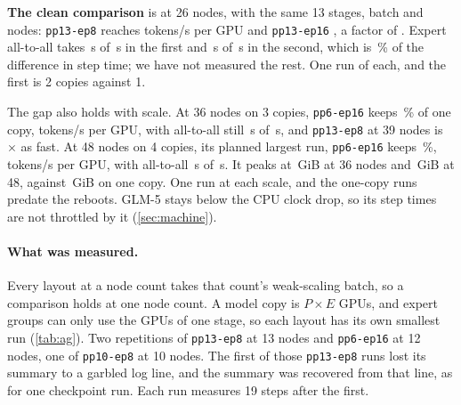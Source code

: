 \textbf{The clean comparison} is at 26 nodes, with the same 13 stages, batch and nodes: \texttt{pp13-ep8} reaches \TriGlmEpEightTok{} tokens/s per GPU and \texttt{pp13-ep16} \TriGlmEpSixteenTok, a factor of \TriGlmEpTwoSixRatio. Expert all-to-all takes \TriGlmEpEightAtoa\,s of \TriGlmEpEightStep\,s in the first and \TriGlmEpSixteenAtoa\,s of \TriGlmEpSixteenStep\,s in the second, which is \TriGlmEpAtoaShare\,\% of the difference in step time; we have not measured the rest. One run of each, and the first is 2 copies against 1.

The gap also holds with scale. At 36 nodes on 3 copies, \texttt{pp6-ep16} keeps \TriGlmThirtySixEff\,\% of one copy, \TriGlmThirtySixTok{} tokens/s per GPU, with all-to-all still \TriGlmThirtySixAtoa\,s of \TriGlmThirtySixStep\,s, and \texttt{pp13-ep8} at 39 nodes is $\times$\TriGlmEpRatioTop{} as fast. At 48 nodes on 4 copies, its planned largest run, \texttt{pp6-ep16} keeps \TriGlmFortyEightEff\,\%, \TriGlmFortyEightTok{} tokens/s per GPU, with all-to-all \TriGlmFortyEightAtoa\,s of \TriGlmFortyEightStep\,s. It peaks at \TriGlmThirtySixMem\,GiB at 36 nodes and \TriGlmFortyEightMem\,GiB at 48, against \TriGlmSixMem\,GiB on one copy. One run at each scale, and the one-copy runs predate the reboots. GLM-5 stays below the CPU clock drop, so its step times are not throttled by it (\cref{sec:machine}).

\paragraph{What was measured.} Every layout at a node count takes that count's weak-scaling batch, so a comparison holds at one node count. A model copy is $P\times E$ GPUs, and expert groups can only use the GPUs of one stage, so each layout has its own smallest run (\cref{tab:ag}). Two repetitions of \texttt{pp13-ep8} at 13 nodes and \texttt{pp6-ep16} at 12 nodes, one of \texttt{pp10-ep8} at 10 nodes. The first of those \texttt{pp13-ep8} runs lost its summary to a garbled log line, and the summary was recovered from that line, as for one checkpoint run. Each run measures 19 steps after the first.

